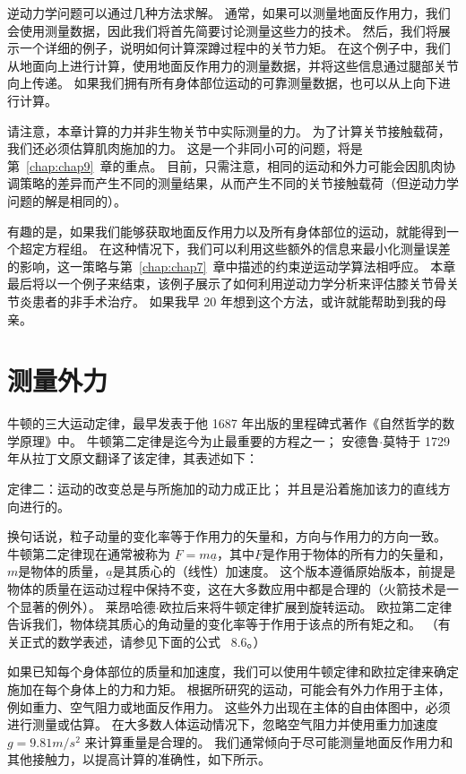 逆动力学问题可以通过几种方法求解。
通常，如果可以测量地面反作用力，我们会使用测量数据，因此我们将首先简要讨论测量这些力的技术。
然后，我们将展示一个详细的例子，说明如何计算深蹲过程中的关节力矩。
在这个例子中，我们从地面向上进行计算，使用地面反作用力的测量数据，并将这些信息通过腿部关节向上传递。
如果我们拥有所有身体部位运动的可靠测量数据，也可以从上向下进行计算。


请注意，本章计算的力并非生物关节中实际测量的力。
为了计算关节接触载荷，我们还必须估算肌肉施加的力。
这是一个非同小可的问题，将是第~\ref{chap:chap9}~章的重点。
目前，只需注意，相同的运动和外力可能会因肌肉协调策略的差异而产生不同的测量结果，从而产生不同的关节接触载荷（但逆动力学问题的解是相同的）。


有趣的是，如果我们能够获取地面反作用力以及所有身体部位的运动，就能得到一个超定方程组。
在这种情况下，我们可以利用这些额外的信息来最小化测量误差的影响，这一策略与第~\ref{chap:chap7}~章中描述的约束逆运动学算法相呼应。
本章最后将以一个例子来结束，该例子展示了如何利用逆动力学分析来评估膝关节骨关节炎患者的非手术治疗。
如果我早 20 年想到这个方法，或许就能帮助到我的母亲。



\section{测量外力}

牛顿的三大运动定律，最早发表于他 1687 年出版的里程碑式著作《自然哲学的数学原理》中。
牛顿第二定律是迄今为止最重要的方程之一；
安德鲁$\cdot$莫特于 1729 年从拉丁文原文翻译了该定律，其表述如下：


定律二：运动的改变总是与所施加的动力成正比；
并且是沿着施加该力的直线方向进行的。


换句话说，粒子动量的变化率等于作用力的矢量和，方向与作用力的方向一致。
牛顿第二定律现在通常被称为 $\underline{F} = m \underline{a}$，其中$\underline{F}$是作用于物体的所有力的矢量和，$m$是物体的质量，$\underline{a}$是其质心的（线性）加速度。
这个版本遵循原始版本，前提是物体的质量在运动过程中保持不变，这在大多数应用中都是合理的（火箭技术是一个显著的例外）。
莱昂哈德$\cdot$欧拉后来将牛顿定律扩展到旋转运动。
欧拉第二定律告诉我们，物体绕其质心的角动量的变化率等于作用于该点的所有矩之和。
（有关正式的数学表述，请参见下面的公式~ 8.6。）


如果已知每个身体部位的质量和加速度，我们可以使用牛顿定律和欧拉定律来确定施加在每个身体上的力和力矩。
根据所研究的运动，可能会有外力作用于主体，例如重力、空气阻力或地面反作用力。
这些外力出现在主体的自由体图中，必须进行测量或估算。
在大多数人体运动情况下，忽略空气阻力并使用重力加速度 $g = 9.81 m/s^2$ 来计算重量是合理的。
我们通常倾向于尽可能测量地面反作用力和其他接触力，以提高计算的准确性，如下所示。


